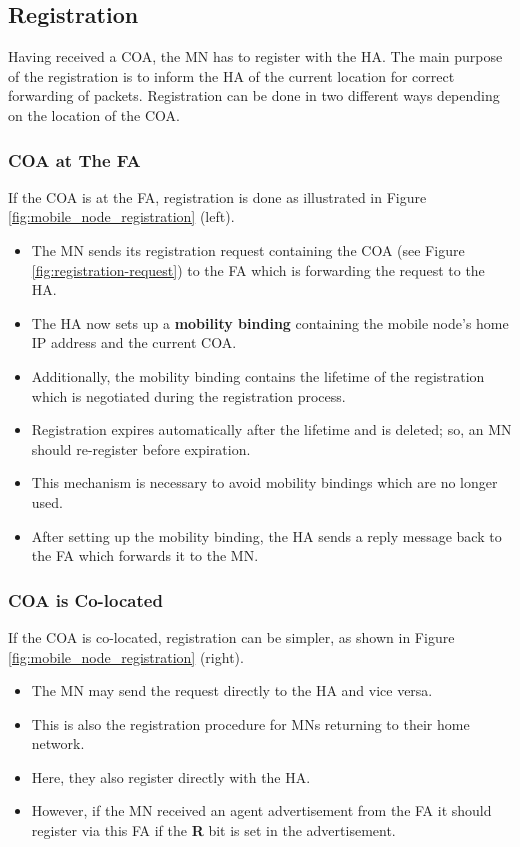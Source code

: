 \subsection{Registration}
Having received a COA, the MN has to register with the HA. The main purpose of the registration is to inform the HA of the current location for correct forwarding of packets. Registration can be done in two different ways depending on the location of the COA.

\subsubsection[COA at FA]{COA at The FA}
If the COA is at the FA, registration is done as illustrated in Figure \ref{fig:mobile_node_registration} (left).

\begin{itemize}
	\item The MN sends its registration request containing the COA (see Figure \ref{fig:registration-request}) to the FA which is forwarding the request to the HA.
	\item The HA now sets up a \textbf{mobility binding} containing the mobile node’s home IP address and the current COA. 
	\item Additionally, the mobility binding contains the lifetime of the registration which is negotiated during the registration process. 
	\item Registration expires automatically after the lifetime and is deleted; so, an MN should re-register before expiration. 
	\item This mechanism is necessary to avoid mobility	bindings which are no longer used. 
	\item After setting up the mobility binding, the HA sends a reply message back to the FA which forwards it to the MN.
\end{itemize}


\subsubsection[Co-located COA]{COA is Co-located}
If the COA is co-located, registration can be simpler, as shown in Figure \ref{fig:mobile_node_registration} (right).
\begin{itemize}
	\item The MN may send the request directly to the HA and vice versa.
	\item This is also the registration procedure for MNs returning to their home network. 
	\item Here, they also register directly with the HA. 
	\item However, if the MN received an agent advertisement from the FA it should register via	this FA if the \textbf{R} bit is set in the advertisement.
\end{itemize}

